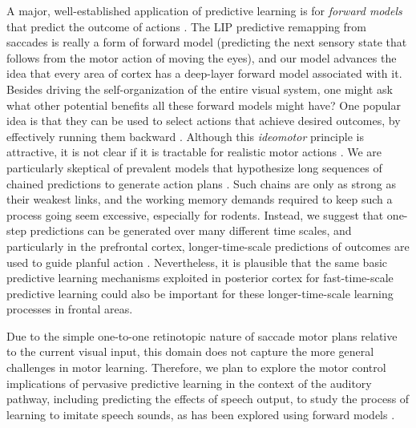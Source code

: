 \documentclass[11pt,twoside]{article}
\newif\myifpdf
\begin{document}
A major, well-established application of predictive learning is for {\em forward models} that predict the outcome of actions \cite{KawatoFurukawaSuzuki87,JordanRumelhart92,MiallWolpert96}.  The LIP predictive remapping from saccades is really a form of forward model (predicting the next sensory state that follows from the motor action of moving the eyes), and our model advances the idea that every area of cortex has a deep-layer forward model associated with it.  Besides driving the self-organization of the entire visual system, one might ask what other potential benefits all these forward models might have?  One popular idea is that they can be used to select actions that achieve desired outcomes, by effectively running them backward \cite{Hommel04,James90,PezzuloCastelfranchi09,Friston10}.  Although this {\em ideomotor} principle is attractive, it is not clear if it is tractable for realistic motor actions \cite{HerbortButz12,JordanRumelhart92}.  We are particularly skeptical of prevalent models that hypothesize long sequences of chained predictions to generate action plans \cite{BurgessOKeefe97,PastalkovaItskovAmarasinghamEtAl08,LismanRedish09}.  Such chains are only as strong as their weakest links, and the working memory demands required to keep such a process going seem excessive, especially for rodents.  Instead, we suggest that one-step predictions can be generated over many different time scales, and particularly in the prefrontal cortex, longer-time-scale predictions of outcomes are used to guide planful action \cite{OReillyHazyMollickEtAl14,OReillyPetrovCohenEtAl14,OReillyHazyHerd16}.  Nevertheless, it is plausible that the same basic predictive learning mechanisms exploited in posterior cortex for fast-time-scale predictive learning could also be important for these longer-time-scale learning processes in frontal areas.  

Due to the simple one-to-one retinotopic nature of saccade motor plans relative to the current visual input, this domain does not capture the more general challenges in motor learning.  Therefore, we plan to explore the motor control implications of pervasive predictive learning in the context of the auditory pathway, including predicting the effects of speech output, to study the process of learning to imitate speech sounds, as has been explored using forward models \cite{GuentherVladusich12}.
\end{document}
